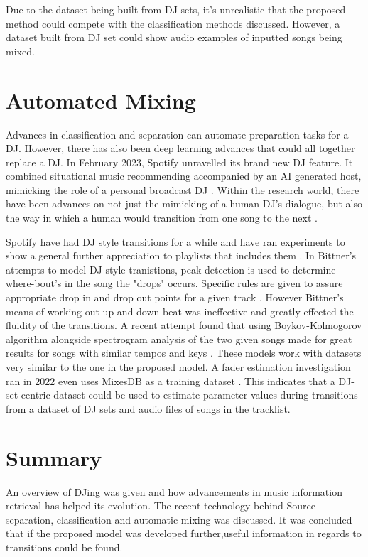Due to the dataset being built from DJ sets, it's unrealistic that the proposed method could compete with the classification methods discussed. However, a dataset built from DJ set could show audio examples of inputted songs being mixed.

\section{Automated Mixing}
Advances in classification and separation can automate preparation tasks for a DJ. However, there has also been deep learning advances that could all together replace a DJ. In February 2023, Spotify unravelled its brand new DJ feature. It combined situational music recommending accompanied by an AI generated host, mimicking the role of a personal broadcast DJ \citep{naomi_spotify_2023}. Within the research world, there have been advances on not just the mimicking of a human DJ's dialogue, but also the way in which a human would transition from one song to the next \citep{chen_automatic_2022}.

Spotify have had DJ style transitions for a while and have ran experiments to show a general further appreciation to playlists that includes them \citep{bittner_automatic_2017}. In Bittner's  attempts to model DJ-style tranistions, peak detection is used to determine where-bout's in the song the "drops" occurs. Specific rules are given to assure appropriate drop in and drop out points for a given track \citep{bittner_automatic_2017}.  However Bittner's means of working out up and down beat was ineffective and greatly effected the fluidity of the transitions. A recent attempt found that using Boykov-Kolmogorov algorithm alongside spectrogram analysis of the two given songs made for great results for songs with similar tempos and keys \citep{robinson_automated_2023}. These models work with datasets very similar to the one in the proposed model. A fader estimation investigation ran in 2022 even uses MixesDB as a training dataset \citep{kim_joint_2022}. This indicates that a DJ-set centric dataset could be used to estimate parameter values during transitions from a dataset of DJ sets and audio files of songs in the tracklist.

\section{Summary}
An overview of DJing was given and how advancements in music information retrieval has helped its evolution. The recent technology behind Source separation, classification and automatic mixing was discussed. It was concluded that if the proposed model was developed further,useful information in regards to transitions could be found.

